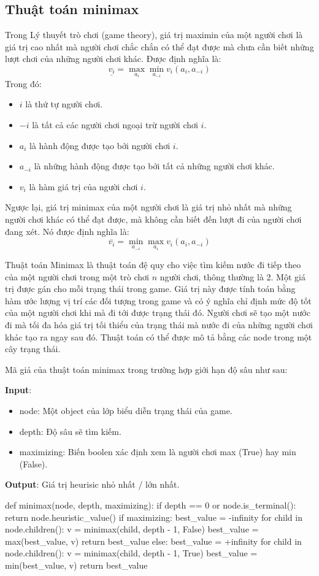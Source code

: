 \documentclass[12pt]{report}
\begin{document}
\subsection{Thuật toán minimax}
Trong Lý thuyết trò chơi (game theory), giá trị maximin của một người chơi là giá trị cao nhất mà người chơi chắc chắn có thể đạt được 
mà chưa cần biết những lượt chơi của những người chơi khác. Được định nghĩa là:
$$
\underline{v_i} = \max_{a_i} \min_{a_{-i}} v_i(a_i, a_{-i})
$$
Trong đó: 
\begin{itemize}
    \item $i$ là thứ tự người chơi. 
    \item $-i$ là tất cả các người chơi ngoại trừ người chơi $i$. 
    \item $a_i$ là hành động được tạo bởi người chơi $i$. 
    \item $a_{-i}$ là những hành động được tạo bởi tất cả những người chơi khác. 
    \item $v_i$ là hàm giá trị của người chơi $i$. 
\end{itemize}
Ngược lại, giá trị minimax của một người chơi là giá trị nhỏ nhất mà những người chơi khác có thể đạt được, mà không cần biết đến lượt 
đi của người chơi đang xét. Nó được định nghĩa là: 
$$
\overline{v_i} = \min_{a_{-i}} \max_{a_i} v_i(a_i, a_{-i})
$$

Thuật toán Minimax là thuật toán đệ quy cho việc tìm kiếm nước đi tiếp theo của một 
người chơi trong một trò chơi $n$ người chơi, thông thường là 2. 
Một giá trị được gán cho mỗi trạng thái trong game. Giá trị này được tính toán bằng hàm ước lượng vị trí các đối tượng trong game
và có ý nghĩa chỉ định mức độ tốt của một người chơi khi mà đi tới được trạng thái đó. 
Người chơi sẽ tạo một nước đi mà tối đa hóa giá trị tối thiểu của trạng thái mà nước đi của những người chơi khác tạo ra ngay sau đó. 
Thuật toán có thể được mô tả bằng các node trong một cây trạng thái. 

Mã giả của thuật toán minimax trong trường hợp giới hạn độ sâu như sau: 
\newpage

\noindent
\textbf{Input}:
\begin{itemize}
    \item node: Một object của lớp biểu diễn trạng thái của game. 
    \item depth: Độ sâu sẽ tìm kiếm. 
    \item maximizing: Biến boolen xác định xem là người chơi max (True) hay min (False). 
\end{itemize}
\textbf{Output}: Giá trị heurisic nhỏ nhất / lớn nhất. \\[0.5cm]
\begin{python}
def minimax(node, depth, maximizing):
    if depth == 0 or node.is_terminal():
        return node.heuristic_value()
    if maximizing:
        best_value = -infinity
        for child in node.children():
            v = minimax(child, depth - 1, False)
            best_value = max(best_value, v)
        return best_value
    else:
        best_value = +infinity
        for child in node.children():
            v = minimax(child, depth - 1, True)
            best_value = min(best_value, v)
        return best_value
\end{python} 
\end{document}

